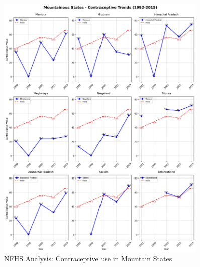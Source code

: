 \begin{figure}[H]
    \centering
    \includegraphics[width=0.9\textwidth]{figures/nfhs/mountainous_states_contraceptive_subplots.pdf}
    \caption{NFHS Analysis: Contraceptive use in Mountain States}
    \label{fig:nfhs_mountain_contraceptive}
\end{figure}

